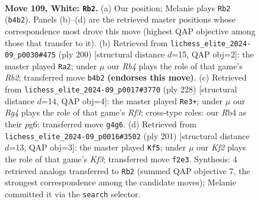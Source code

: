 \documentclass[11pt]{article}
\begin{document}
\clearpage

\begin{figure}[p]\centering
\begin{subfigure}{0.46\textwidth}\centering
\resizebox{\linewidth}{!}{%
\newchessgame
\chessboard[
  setfen={8/3k4/4p3/4P3/1R3PR1/8/5K2/r7 w - - 3 109},
  showmover=false,
  pgfstyle=straightmove, color=movearrow, markmove={b4-b2}
]}
\caption{}
\end{subfigure}\hfill
\begin{subfigure}{0.46\textwidth}\centering
\resizebox{\linewidth}{!}{%
\newchessgame
\chessboard[
  setfen={8/6k1/8/7p/7P/6P1/1R4K1/2r5 w - - 47 101},
  showmover=false,
  pgfstyle=straightmove, color=movearrow, markmove={b2-a2}
]}
\caption{}
\end{subfigure}
\\[4pt]
\begin{subfigure}{0.46\textwidth}\centering
\resizebox{\linewidth}{!}{%
\newchessgame
\chessboard[
  setfen={8/r7/4k1p1/7p/7P/5RP1/8/6K1 w - - 66 115},
  showmover=false,
  pgfstyle=straightmove, color=movearrow, markmove={f3-e3}
]}
\caption{}
\end{subfigure}\hfill
\begin{subfigure}{0.46\textwidth}\centering
\resizebox{\linewidth}{!}{%
\newchessgame
\chessboard[
  setfen={8/8/5kp1/8/5P2/6K1/3r3p/R7 b - - 25 101},
  showmover=false,
  pgfstyle=straightmove, color=movearrow, markmove={f6-f5}
]}
\caption{}
\end{subfigure}
\caption{\textbf{Move 109, White: \texttt{Rb2}.} (a) Our position; Melanie plays \texttt{Rb2} (\texttt{b4b2}). Panels (b)--(d) are the retrieved master positions whose correspondence most drove this move (highest QAP objective among those that transfer to it). (b) Retrieved from \texttt{lichess\_elite\_2024-09\_p0030\#475} (ply 200) [structural distance $d$=15, QAP obj=2]: the master played \texttt{Ra2}; under $\mu$ our \emph{Rb4} plays the role of that game's \emph{Rb2}; transferred move \texttt{b4b2} \textbf{(endorses this move)}. (c) Retrieved from \texttt{lichess\_elite\_2024-09\_p0017\#3770} (ply 228) [structural distance $d$=14, QAP obj=4]: the master played \texttt{Re3+}; under $\mu$ our \emph{Rg4} plays the role of that game's \emph{Rf3}; cross-type roles: our \emph{R}b4 as their \emph{p}g6; transferred move \texttt{g4g6}. (d) Retrieved from \texttt{lichess\_elite\_2024-09\_p0016\#3502} (ply 201) [structural distance $d$=13, QAP obj=3]: the master played \texttt{Kf5}; under $\mu$ our \emph{Kf2} plays the role of that game's \emph{Kf3}; transferred move \texttt{f2e3}. Synthesis: 4 retrieved analogs transferred to \texttt{Rb2} (summed QAP objective 7, the strongest correspondence among the candidate moves); Melanie committed it via the \texttt{search} selector.}
\label{fig:thought-m216}
\end{figure}
\end{document}
